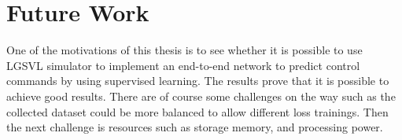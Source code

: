 \chapter{Future Work}
One of the motivations of this thesis is to see whether it is possible to use LGSVL
simulator to implement an end-to-end network to predict control commands by using
supervised learning. The results prove that it is possible to achieve good results.
There are of course some challenges on the way such as the collected dataset could be more
balanced to allow different loss trainings. Then the next challenge is resources such as
storage memory, and processing power.
